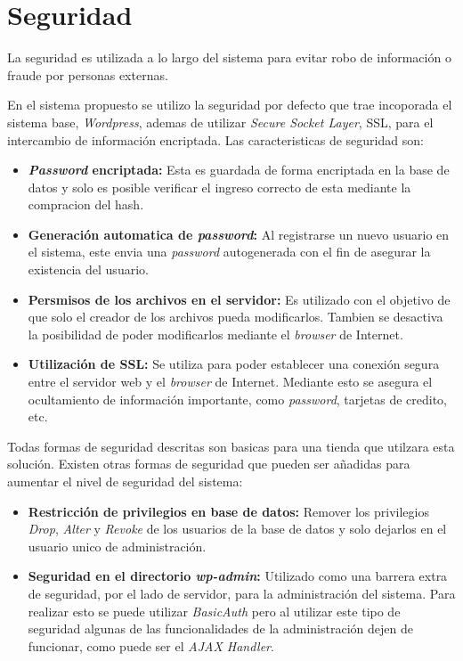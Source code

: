 \section{Seguridad}

La seguridad es utilizada a lo largo del sistema para evitar robo de información o 
fraude por personas externas. 

En el sistema propuesto se utilizo la seguridad por defecto que trae incoporada
el sistema base, \emph{Wordpress}, ademas de utilizar \emph{Secure Socket Layer}, SSL, para el
 intercambio de información encriptada. Las caracteristicas de seguridad son:

\begin{itemize}

\item {\bf \emph{Password} encriptada:} Esta es guardada de forma encriptada en la base de datos y solo es 
	posible verificar el ingreso correcto de esta mediante la compracion del hash.
\item {\bf Generación automatica de \emph{password}:} Al registrarse un nuevo usuario en el sistema, este 
	envia una \emph{password} autogenerada con el fin de asegurar la existencia del usuario.
\item {\bf Persmisos de los archivos en el servidor:} Es utilizado con el objetivo de que solo el creador
	de los archivos pueda modificarlos. Tambien se desactiva la posibilidad de poder modificarlos
	mediante el \emph{browser} de Internet.
\item {\bf Utilización de SSL:} Se utiliza para poder establecer una conexión segura entre el servidor web
	y el \emph{browser} de Internet. Mediante esto se asegura el ocultamiento de información
	importante, como \emph{password}, tarjetas de credito, etc. 
\end{itemize}  

Todas formas  de seguridad descritas son basicas para una tienda que utilzara esta solución. Existen 
otras formas de seguridad que pueden ser añadidas para aumentar el nivel de seguridad del sistema:

\begin{itemize}

\item {\bf Restricción de privilegios en base de datos:} Remover los privilegios \emph{Drop}, 
\emph{Alter} y \emph{Revoke} de los usuarios de la base de datos y solo dejarlos en el usuario
unico de administración.

\item {\bf Seguridad en el directorio \emph{wp-admin}:} Utilizado como una barrera extra de seguridad,
por el lado de servidor, para la administración del sistema. Para realizar esto se puede utilizar 
\emph{BasicAuth} pero al utilizar este tipo de seguridad algunas de las funcionalidades de la 
administración dejen de funcionar, como puede ser el \emph{AJAX Handler}.

\end{itemize}

